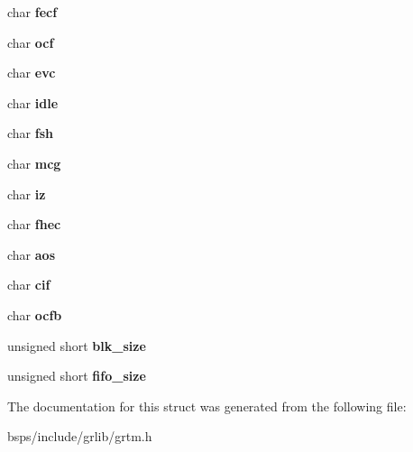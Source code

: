 \begin{DoxyCompactItemize}
char {\bfseries fecf}
\item 
\mbox{\label{structgrtm__ioc__hw_a2ab18d1dd0343667ae7e6dcc17a6c85e}} 
char {\bfseries ocf}
\item 
\mbox{\label{structgrtm__ioc__hw_ad1e15e22a2f74b7c7c0dad310c84c653}} 
char {\bfseries evc}
\item 
\mbox{\label{structgrtm__ioc__hw_a8c565f1f00548c938ff030f412e472da}} 
char {\bfseries idle}
\item 
\mbox{\label{structgrtm__ioc__hw_a1dfb71889ffcb245030847b85768e8aa}} 
char {\bfseries fsh}
\item 
\mbox{\label{structgrtm__ioc__hw_ad3e1c588b5735293b4871f6275fdf0a1}} 
char {\bfseries mcg}
\item 
\mbox{\label{structgrtm__ioc__hw_ac537a1384c19ee2099812848eab9be54}} 
char {\bfseries iz}
\item 
\mbox{\label{structgrtm__ioc__hw_ac9302ee86a705c16a93405ba1c537105}} 
char {\bfseries fhec}
\item 
\mbox{\label{structgrtm__ioc__hw_a04e28fe098a3b21d582cc37803e02113}} 
char {\bfseries aos}
\item 
\mbox{\label{structgrtm__ioc__hw_ae610cfcae91cef5c330209c3797f7cab}} 
char {\bfseries cif}
\item 
\mbox{\label{structgrtm__ioc__hw_a417d2f41c246d214e4228b6e5300687e}} 
char {\bfseries ocfb}
\item 
\mbox{\label{structgrtm__ioc__hw_a7fab03fb3ae4e868f6239ee09a33d289}} 
unsigned short {\bfseries blk\+\_\+size}
\item 
\mbox{\label{structgrtm__ioc__hw_a6d4ec65dc16ff6f46893dd93c1ed870d}} 
unsigned short {\bfseries fifo\+\_\+size}
\end{DoxyCompactItemize}


The documentation for this struct was generated from the following file\+:\begin{DoxyCompactItemize}
\item 
bsps/include/grlib/grtm.\+h\end{DoxyCompactItemize}
